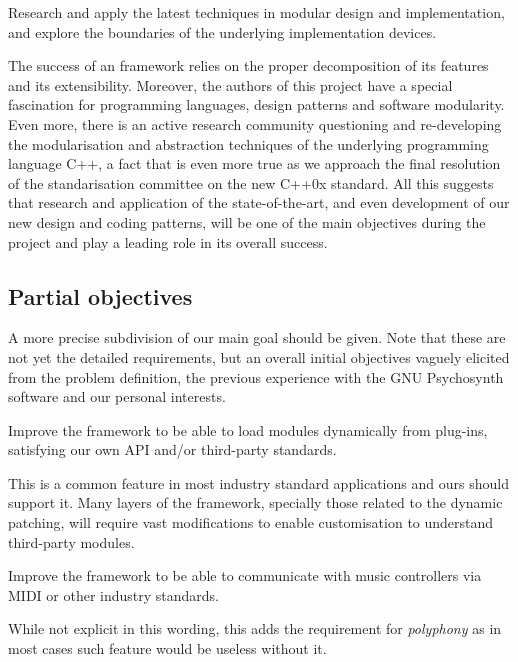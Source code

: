 \begin{objective}
  Research and apply the latest techniques in modular design and
  implementation, and explore the boundaries of the underlying
  implementation devices.
\end{objective}

The success of an framework relies on the proper decomposition of its
features and its extensibility. Moreover, the authors of this project
have a special fascination for programming languages, design patterns
and software modularity. Even more, there is an active research
community questioning and re-developing the modularisation and
abstraction techniques of the underlying programming language C++, a
fact that is even more true as we approach the final resolution of the
standarisation committee on the new C++0x standard. All this suggests
that research and application of the state-of-the-art, and even
development of our new design and coding patterns, will be one of the
main objectives during the project and play a leading role in its
overall success.

\subsection{Partial objectives}

A more precise subdivision of our main goal should be given. Note that
these are not yet the detailed requirements, but an overall initial
objectives vaguely elicited from the problem definition, the previous
experience with the GNU Psychosynth software and our personal
interests.

\begin{objective}
  Improve the framework to be able to load modules dynamically from
  plug-ins, satisfying our own API and/or third-party
  standards.
\end{objective}

This is a common feature in most industry standard applications and
ours should support it. Many layers of the framework, specially those
related to the dynamic patching, will require vast modifications to
enable customisation to understand third-party modules.

\begin{objective}
  Improve the framework to be able to communicate with music
  controllers via MIDI or other industry standards.
\end{objective}

While not explicit in this wording, this adds the requirement for
\emph{polyphony} as in most cases such feature would
be useless without it.

